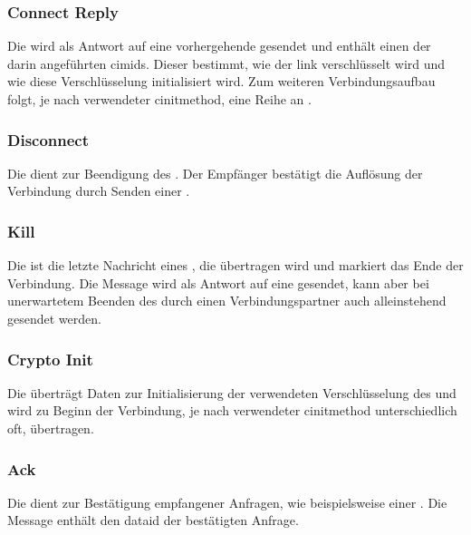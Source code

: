 \bmcpconnectreqbytefield


\subsubsection*{Connect Reply}
\label{dcl-bmcp-connectrep}
Die \msg{\bmcpconnectrep} wird als Antwort auf eine vorhergehende
\msg{\bmcpconnectreq} gesendet und enthält einen der darin angeführten
\glspl{cimid}.
Dieser bestimmt, wie der \gls{link} verschlüsselt wird und wie diese
Verschlüsselung initialisiert wird.
Zum weiteren Verbindungsaufbau folgt, je nach verwendeter \gls{cinitmethod},
eine Reihe an \msgpl{\bmcpcryptoinit}.

\bmcpconnectrepbytefield


\subsubsection*{Disconnect}
\label{dcl-bmcp-disconnect}
Die \msg{\bmcpdisconnect} dient zur Beendigung des .
Der Empfänger bestätigt die Auflösung der Verbindung durch Senden einer
\msg{\bmcpkill}.

\bmcpdisconnectbytefield


\subsubsection*{Kill}
\label{dcl-bmcp-kill}
Die \msg{\bmcpkill} ist die letzte Nachricht eines , die
übertragen wird und markiert das Ende der Verbindung.
Die Message wird als Antwort auf eine \msg{\bmcpdisconnect} gesendet, kann aber
bei unerwartetem Beenden des  durch einen
Verbindungspartner auch alleinstehend gesendet werden.

\bmcpkillbytefield


\subsubsection*{Crypto Init}
\label{dcl-bmcp-cryptoinit}
Die \msg{\bmcpcryptoinit} überträgt Daten zur Initialisierung der verwendeten
Verschlüsselung des  und wird zu Beginn der Verbindung, je
nach verwendeter \gls{cinitmethod} unterschiedlich oft, übertragen.

\bmcpcryptoinitbytefield


\subsubsection*{Ack}
\label{dcl-bmcp-ack}
Die \msg{\bmcpack} dient zur Bestätigung empfangener Anfragen, wie
beispielsweise einer \msg{\bmcpopenchreq}.
Die Message enthält den \gls{dataid} der bestätigten Anfrage.

